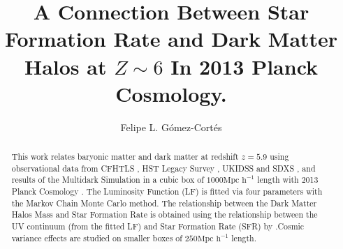 \documentclass[manuscript]{aastex}
\begin{document}
\title{A Connection Between Star Formation Rate and Dark Matter Halos at 
$Z\sim6$ In 2013 Planck Cosmology.}

\author{Felipe L. G\'omez-Cort\'es }

\begin{abstract}
This work relates baryonic matter and dark matter at redshift $z=5.9$ using 
observational data from CFHTLS \citep{willott13}, HST Legacy Survey
\citep{bouwens14,finkelstein14}, UKIDSS and SDXS \citep{mclure09}, and results of 
the Multidark Simulation \citep{klypin14} in a cubic box of $1000 \textrm{Mpc 
h}^{-1}$ length with 2013 Planck Cosmology \citep{planck1}. The Luminosity Function (LF) is 
fitted via four parameters with the Markov Chain Monte Carlo method. The 
relationship between the Dark Matter Halos Mass and Star Formation Rate is 
obtained using the relationship between the UV  continuum (from the fitted LF) 
and Star Formation Rate (SFR) by \cite{kennicutt98}.Cosmic variance effects are 
studied on smaller boxes of $250 \textrm{Mpc h}^{-1}$ length.

\end{abstract}

%






\acknowledgments
\appendix

\end{document}
